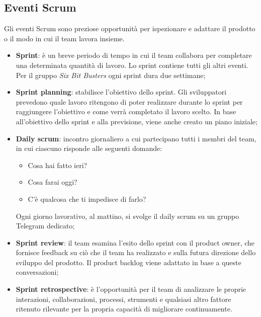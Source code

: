 \subsection{Eventi Scrum}
Gli eventi Scrum sono preziose opportunità per ispezionare e adattare il
prodotto o il modo in cui il team lavora insieme.
\begin{itemize}
    \item \textbf{Sprint}: è un breve periodo di tempo in cui il team collabora per
          completare una determinata quantità di lavoro. Lo sprint contiene tutti gli altri eventi.
          Per il gruppo \textit{Six Bit Busters} ogni sprint dura due settimane;
    \item \textbf{Sprint planning}: stabilisce l'obiettivo dello sprint.
          Gli sviluppatori prevedono quale lavoro ritengono di poter realizzare durante
          lo sprint per raggiungere l'obiettivo e come verrà completato il lavoro scelto.
          In base all'obiettivo dello sprint e alla previsione, viene anche creato un piano iniziale;
    \item \textbf{Daily scrum}: incontro giornaliero a cui partecipano tutti i membri del team,
          in cui ciascuno risponde alle seguenti domande:
          \begin{itemize}
              \item Cosa hai fatto ieri?
              \item Cosa farai oggi?
              \item C'è qualcosa che ti impedisce di farlo?
          \end{itemize}
          Ogni giorno lavorativo, al mattino, si svolge il daily scrum su un gruppo Telegram dedicato;
    \item \textbf{Sprint review}: il team esamina l'esito dello sprint con il
          product owner, che fornisce feedback su ciò che il team ha realizzato
          e sulla futura direzione dello sviluppo del prodotto. Il product backlog
          viene adattato in base a queste conversazioni;
    \item \textbf{Sprint retrospective}: è l'opportunità per il team di analizzare le
          proprie interazioni, collaborazioni, processi, strumenti e qualsiasi altro fattore
          ritenuto rilevante per la propria capacità di migliorare continuamente.
\end{itemize}

